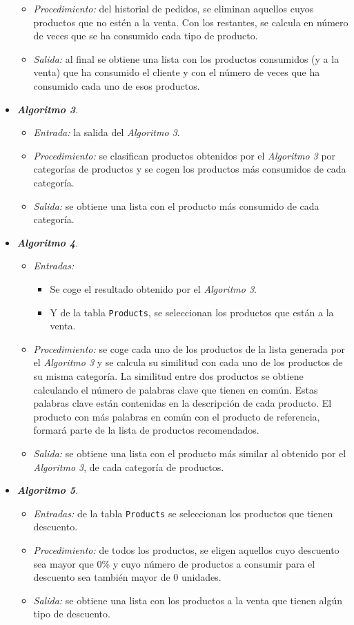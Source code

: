 \begin{itemize}
\begin{itemize}
  \item \emph{Procedimiento:} del historial de pedidos, se eliminan aquellos
  cuyos productos que no estén a la venta. Con los restantes, se calcula en
  número de veces que se ha consumido cada tipo de producto.
  \item \emph{Salida:} al final se obtiene una lista con los productos
  consumidos (y a la venta) que ha consumido el cliente y con el número de
  veces que ha consumido cada uno de esos productos.
  \end{itemize}
\item \textbf{\emph{Algoritmo 3}}.
  \begin{itemize}
  \item \emph{Entrada:} la salida del \emph{Algoritmo 3}.
  \item \emph{Procedimiento:} se clasifican productos obtenidos por
  el \emph{Algoritmo 3} por categorías de productos y se cogen los productos
  más consumidos de cada categoría.
  \item \emph{Salida:} se obtiene una lista con el producto más consumido de
  cada categoría.
  \end{itemize}
\item \textbf{\emph{Algoritmo 4}}.
  \begin{itemize}
  \item \emph{Entradas:}
    \begin{itemize}
    \item Se coge el resultado obtenido por el \emph{Algoritmo 3}.
    \item Y de la tabla \texttt{Products}, se seleccionan los productos que 
    están a la venta.
    \end{itemize}
  \item \emph{Procedimiento:} se coge cada uno de los productos de la lista
  generada por el \emph{Algoritmo 3} y se calcula su similitud con cada uno
  de los productos de su misma categoría. La similitud entre dos productos se 
  obtiene calculando el número de palabras clave que tienen en común. Estas 
  palabras clave están contenidas en la descripción de cada producto. El 
  producto con más palabras en común con el producto de referencia, formará 
  parte de la lista de productos recomendados.
  \item \emph{Salida:} se obtiene una lista con el producto más similar al
  obtenido por el \emph{Algoritmo 3}, de cada categoría de productos.
  \end{itemize}
\item \textbf{\emph{Algoritmo 5}}.
  \begin{itemize}
  \item \emph{Entradas:} de la tabla \texttt{Products} se seleccionan los
  productos que tienen descuento.
  \item \emph{Procedimiento:} de todos los productos, se eligen aquellos cuyo
  descuento sea mayor que 0\% y cuyo número de productos a consumir para el
  descuento sea también mayor de 0 unidades.
  \item \emph{Salida:} se obtiene una lista con los productos a la venta que
  tienen algún tipo de descuento.
  \end{itemize}
\end{itemize}

